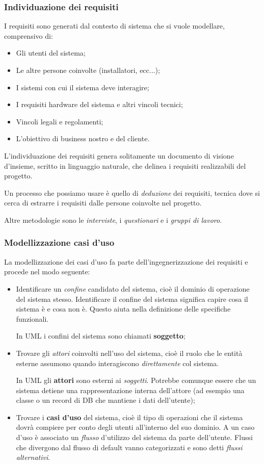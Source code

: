 \documentclass[a4paper,11pt]{article}
\begin{document}
\subsubsection{Individuazione dei requisiti}
I requisiti sono generati dal contesto di sistema che si vuole modellare, comprensivo di:
\begin{itemize}
	\item Gli utenti del sistema;
	\item Le altre persone coinvolte (installatori, ecc...);
	\item I sistemi con cui il sistema deve interagire; 
	\item I requisiti hardware del sistema e altri vincoli tecnici;
	\item Vincoli legali e regolamenti;
	\item L'obiettivo di business nostro e del cliente.
\end{itemize}

L'individuazione dei requisiti genera solitamente un documento di visione d'insieme, scritto in linguaggio naturale, che delinea i requisiti realizzabili del progetto.

Un processo che possiamo usare è quello di \textit{deduzione} dei requisiti, tecnica dove si cerca di estrarre i requisiti dalle persone coinvolte nel progetto.

Altre metodologie sono le \textit{interviste}, i \textit{questionari} e i \textit{gruppi di lavoro}.

\subsubsection{Modellizzazione casi d'uso}
La modellizzazione dei casi d'uso fa parte dell'ingegnerizzazione dei requisiti e procede nel modo seguente:
\begin{itemize}
	\item Identificare un \textit{confine} candidato del sistema, cioè il dominio di operazione del sistema stesso. Identificare il confine del sistema significa capire cosa il sistema è e cosa non è. Questo aiuta nella definizione delle specifiche funzionali.

		In UML i confini del sistema sono chiamati \textbf{soggetto};
	\item Trovare gli \textit{attori} coinvolti nell'uso del sistema, cioè il ruolo che le entità esterne assumono quando interagiscono \textit{direttamente} col sistema.

		In UML gli \textbf{attori} sono esterni ai \textit{soggetti}. Potrebbe comunque essere che un sistema detiene una rappresentazione interna dell'attore (ad esempio una classe o un record di DB che mantiene i dati dell'utente);
	\item Trovare i \textbf{casi d'uso} del sistema, cioè il tipo di operazioni che il sistema dovrà compiere per conto degli utenti all'interno del suo dominio. A un caso d'uso è associato un \textit{flusso} d'utilizzo del sistema da parte dell'utente. Flussi che divergono dal flusso di default vanno categorizzati e sono detti \textit{flussi alternativi}.
\end{itemize}
\end{document}
